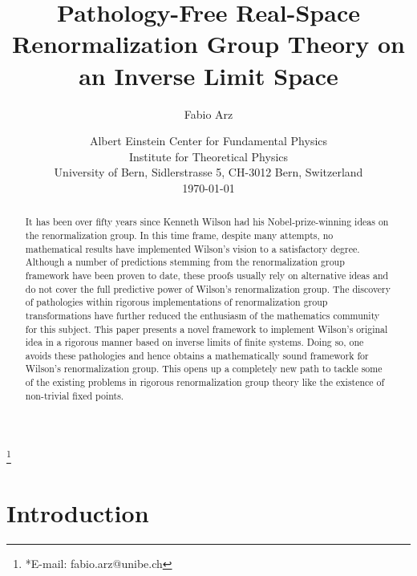 \documentclass{article}
\title{Pathology-Free Real-Space Renormalization Group Theory on an Inverse Limit Space}
\author{Fabio Arz}
\date{Albert Einstein Center for Fundamental Physics\\
        Institute for Theoretical Physics\\
        University of Bern, Sidlerstrasse 5, CH-3012 Bern, Switzerland\\[2ex]
        \today}
\newcommand\blfootnote[1]{%
  \begingroup
  \renewcommand\thefootnote{}\footnote{#1}%
  \addtocounter{footnote}{-1}%
  \endgroup
}
\begin{document}
\maketitle

\begin{abstract}
    It has been over fifty years since Kenneth Wilson had his Nobel-prize-winning ideas on the renormalization group. In this time frame, despite many attempts, no mathematical results have implemented Wilson's vision to a satisfactory degree. Although a number of predictions stemming from the renormalization group framework have been proven to date, these proofs usually rely on alternative ideas and do not cover the full predictive power of Wilson's renormalization group. The discovery of pathologies within rigorous implementations of renormalization group transformations have further reduced the enthusiasm of the mathematics community for this subject. This paper presents a novel framework to implement Wilson's original idea in a rigorous manner based on inverse limits of finite systems. Doing so, one avoids these pathologies and hence obtains a mathematically sound framework for Wilson's renormalization group. This opens up a completely new path to tackle some of the existing problems in rigorous renormalization group theory like the existence of non-trivial fixed points.
\end{abstract}

\blfootnote{*E-mail: fabio.arz@unibe.ch}


\newpage


\section{Introduction}
\end{document}
